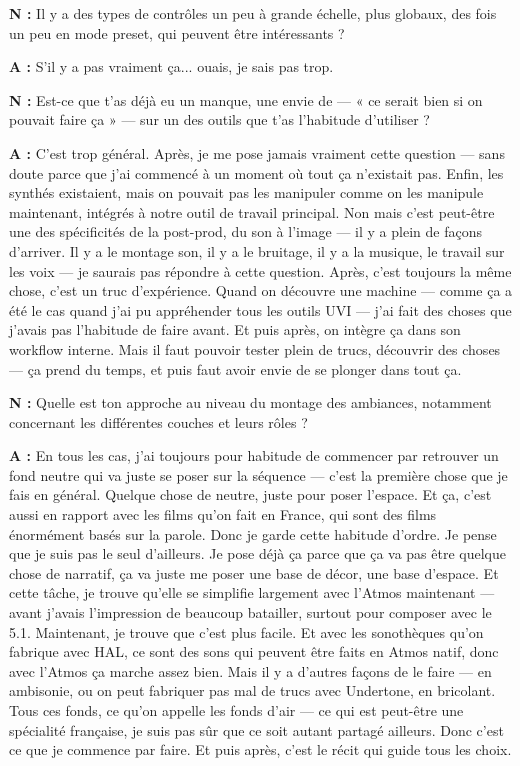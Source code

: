 ﻿\documentclass[12pt]{article}
\begin{document}
\textbf{N :} Il y a des types de contrôles un peu à grande échelle, plus globaux, des fois un peu en mode preset, qui peuvent être intéressants ? 

\textbf{A :} S'il y a pas vraiment ça... ouais, je sais pas trop. 

\textbf{N :} Est-ce que t'as déjà eu un manque, une envie de — « ce serait bien si on pouvait faire ça » — sur un des outils que t'as l'habitude d'utiliser ? 

\textbf{A :} C'est trop général. Après, je me pose jamais vraiment cette question — sans doute parce que j'ai commencé à un moment où tout ça n'existait pas. Enfin, les synthés existaient, mais on pouvait pas les manipuler comme on les manipule maintenant, intégrés à notre outil de travail principal. Non mais c'est peut-être une des spécificités de la post-prod, du son à l'image — il y a plein de façons d'arriver. Il y a le montage son, il y a le bruitage, il y a la musique, le travail sur les voix — je saurais pas répondre à cette question. Après, c'est toujours la même chose, c'est un truc d'expérience. Quand on découvre une machine — comme ça a été le cas quand j'ai pu appréhender tous les outils UVI — j'ai fait des choses que j'avais pas l'habitude de faire avant. Et puis après, on intègre ça dans son workflow interne. Mais il faut pouvoir tester plein de trucs, découvrir des choses — ça prend du temps, et puis faut avoir envie de se plonger dans tout ça. 

\textbf{N :} Quelle est ton approche au niveau du montage des ambiances, notamment concernant les différentes couches et leurs rôles ? 

\textbf{A :} En tous les cas, j'ai toujours pour habitude de commencer par retrouver un fond neutre qui va juste se poser sur la séquence — c'est la première chose que je fais en général. Quelque chose de neutre, juste pour poser l'espace. Et ça, c'est aussi en rapport avec les films qu'on fait en France, qui sont des films énormément basés sur la parole. Donc je garde cette habitude d'ordre. Je pense que je suis pas le seul d'ailleurs. Je pose déjà ça parce que ça va pas être quelque chose de narratif, ça va juste me poser une base de décor, une base d'espace. Et cette tâche, je trouve qu'elle se simplifie largement avec l'Atmos maintenant — avant j'avais l'impression de beaucoup batailler, surtout pour composer avec le 5.1. Maintenant, je trouve que c'est plus facile. Et avec les sonothèques qu'on fabrique avec HAL, ce sont des sons qui peuvent être faits en Atmos natif, donc avec l'Atmos ça marche assez bien. Mais il y a d'autres façons de le faire — en ambisonie, ou on peut fabriquer pas mal de trucs avec Undertone, en bricolant. Tous ces fonds, ce qu'on appelle les fonds d'air — ce qui est peut-être une spécialité française, je suis pas sûr que ce soit autant partagé ailleurs. Donc c'est ce que je commence par faire. Et puis après, c'est le récit qui guide tous les choix. 
\end{document}
